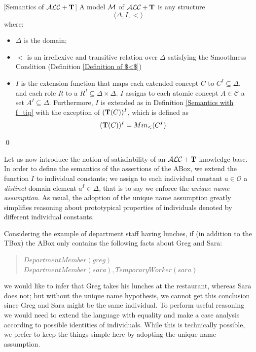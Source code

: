 \documentclass[a4paper, 11pt, oneside]{duthesis}
\newcommand{\tip}{{\bf T}}
\newcommand{\alct}{\mathcal{ALC}+\tip}
\newcommand{\emme} {\begin{mathcal}M\end{mathcal}}
\newenvironment{definition}
{\begin{defi} \rm}{\qed \end{defi}}
\newenvironment{definition}
{\begin{defi} \rm}{\qed \end{defi}}
\newtheorem{definition}{Definition}
\newcounter{posu}
\newtheorem{definition}[posu]{Definition}
\begin{document}
\begin{definition}[Semantics of $\alct$]\label{Semantics of T} A model $\emme$ of $\alct$ is any structure $$\langle \Delta, I, < \rangle$$ where:

\begin{itemize}

\item $\Delta$ is the domain;

\item $<$ is an irreflexive and transitive relation over $\Delta$ satisfying the Smoothness Condition (Definition \ref{Definition of $<$})

\item $I$ is the extension function that maps each  extended concept $C$ to $C^I \subseteq \Delta$, and each role $R$ to a $R^I \subseteq \Delta \times \Delta$.
$I$ assigns to each atomic concept $A \in \mathcal{C}$ a set $A^I \subseteq \Delta$.
Furthermore, $I$ is extended as in Definition \ref{Semantics with f_tip} with the exception of $(\tip(C))^I$, which is defined as $$(\tip(C))^I = Min_<(C^I).$$
\end{itemize}

\end{definition}

\noindent Let us now introduce the notion of satisfiability of an $\alct$ knowledge base.
In order to define the semantics of the assertions of the ABox, we  extend the function $I$ to individual constants;  we assign to each individual constant $a \in \mathcal{O}$ a \emph{distinct} domain element $a^I \in \Delta$, that is to say we enforce the \emph{unique name assumption}.
As usual, the adoption of the  unique name assumption greatly simplifies reasoning about prototypical properties of individuals denoted by different individual constants.


Considering the example of department staff having lunches, if (in addition to the TBox) the ABox only contains the following facts about Greg and Sara:

\begin{quote}
$\mathit{DepartmentMember}(\mathit{greg})$ \\
$\mathit{DepartmentMember}(\mathit{sara}), \mathit{TemporaryWorker}(\mathit{sara})$
\end{quote}

\noindent we would like to infer that Greg takes his lunches at the restaurant, whereas Sara does not; but without the unique name hypothesis, we cannot get this conclusion since Greg and Sara might be the same individual.
To perform useful reasoning we would need to  extend the language with equality and make a case analysis according to possible identities of individuals. While this is technically possible, we prefer to keep the things simple here by adopting the unique name assumption.
\end{document}
